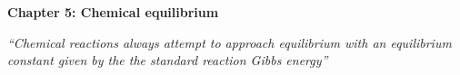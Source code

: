 \renewcommand{\theequation}{5.\arabic{equation}}

\begin{frame}
\begin{center}
{\bf Chapter 5: Chemical equilibrium}\\
\end{center}

\scriptsize

\vspace*{3cm}

\begin{center}
\textit{``Chemical reactions always attempt to approach equilibrium with an equilibrium constant given by the the standard reaction Gibbs energy''}
\end{center}

\end{frame}

\scriptsize










